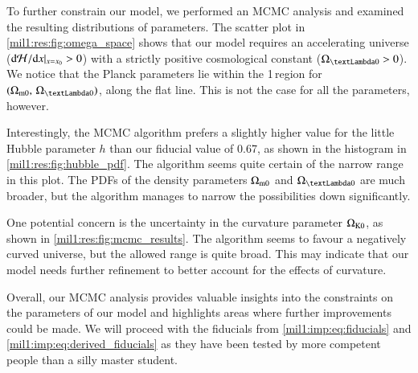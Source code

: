    To further constrain our model, we performed an MCMC analysis and examined the resulting distributions of parameters. The scatter plot in \cref{mil1:res:fig:omega_space} shows that our model requires an accelerating universe ($\mathrm{d} \mathcal{H}/\mathrm{d} x|_{x=x_0} > 0$) with a strictly positive cosmological constant ($\OmgL>0$). We notice that the Planck parameters lie within the 1\textsigma\,region for $(\OmgM,\, \OmgL)$, along the flat line. This is not the case for all the parameters, however. 
    
    Interestingly, the MCMC algorithm prefers a slightly higher value for the little Hubble parameter $h$ than our fiducial value of 0.67, as shown in the histogram in \cref{mil1:res:fig:hubble_pdf}. The algorithm seems quite certain of the narrow range in this plot. The PDFs of the density parameters $\Omega_{\mathrm{m}0}$ and $\OmgL$ are much broader, but the algorithm manages to narrow the possibilities down significantly.

    One potential concern is the uncertainty in the curvature parameter $\Omega_{\mathrm{K}0}$, as shown in \cref{mil1:res:fig:mcmc_results}. The algorithm seems to favour a negatively curved universe, but the allowed range is quite broad. This may indicate that our model needs further refinement to better account for the effects of curvature. 
    
    Overall, our MCMC analysis provides valuable insights into the constraints on the parameters of our model and highlights areas where further improvements could be made. We will proceed with the fiducials from \cref{mil1:imp:eq:fiducials} and \cref{mil1:imp:eq:derived_fiducials} as they have been tested by more competent people than a silly master student. 





